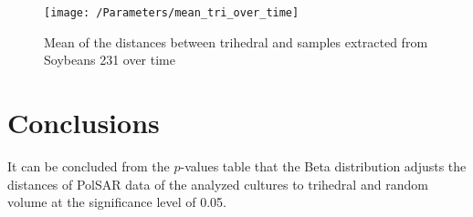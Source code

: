 \documentclass[12pt]{article}
\begin{document}
\begin{figure}[!h]
  \texttt{[image: /Parameters/mean\_tri\_over\_time]}
  \caption{Mean of the distances between trihedral and samples extracted from Soybeans 231 over time}
  \label{fig:tri_mean_sb231}
\end{figure}
\section{Conclusions}
It can be concluded from the $p$-values table that the Beta distribution adjusts the distances of PolSAR data of the analyzed cultures to trihedral and random volume at the significance level of 0.05.
\end{document}
